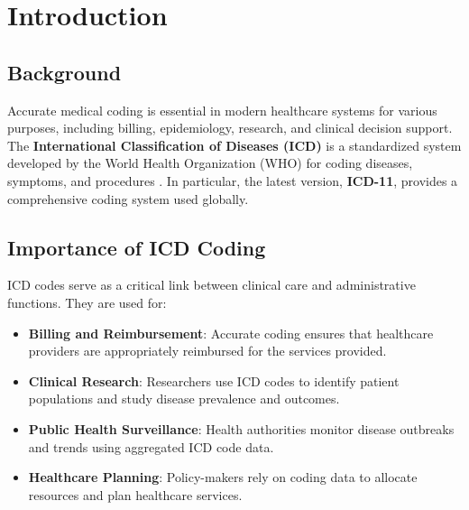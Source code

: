 \documentclass[12pt,a4paper]{report}
\begin{document}
\tableofcontents
\newpage


\chapter{Introduction}

\section{Background}
Accurate medical coding is essential in modern healthcare systems for various purposes, including billing, epidemiology, research, and clinical decision support. The \textbf{International Classification of Diseases (ICD)} is a standardized system developed by the World Health Organization (WHO) for coding diseases, symptoms, and procedures \cite{who2019icd11}. In particular, the latest version, \textbf{ICD-11}, provides a comprehensive coding system used globally.

\section{Importance of ICD Coding}
ICD codes serve as a critical link between clinical care and administrative functions. They are used for:
\begin{itemize}
    \item \textbf{Billing and Reimbursement}: Accurate coding ensures that healthcare providers are appropriately reimbursed for the services provided.
    \item \textbf{Clinical Research}: Researchers use ICD codes to identify patient populations and study disease prevalence and outcomes.
    \item \textbf{Public Health Surveillance}: Health authorities monitor disease outbreaks and trends using aggregated ICD code data.
    \item \textbf{Healthcare Planning}: Policy-makers rely on coding data to allocate resources and plan healthcare services.
\end{itemize}
\end{document}

